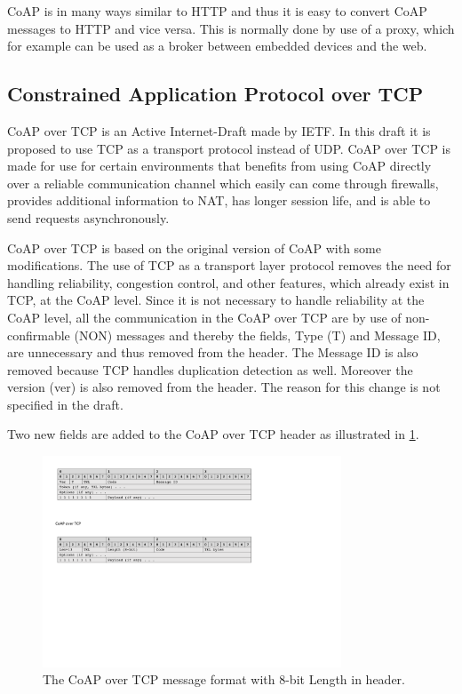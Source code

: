 CoAP is in many ways similar to HTTP and thus it is easy to convert CoAP messages to HTTP and vice versa. This is normally done by use of a proxy, which for example can be used as a broker between embedded devices and the web. 




\subsection{Constrained Application Protocol over TCP}
CoAP over TCP is an Active Internet-Draft made by IETF. 
In this draft it is proposed to use TCP as a transport protocol instead of UDP.
CoAP over TCP is made for use for certain environments that benefits from using CoAP directly over a reliable communication channel which easily can come through firewalls, provides additional information to NAT, has longer session life, and is able to send requests asynchronously. 

CoAP over TCP is based on the original version of CoAP with some modifications. 
The use of TCP as a transport layer protocol removes the need for handling reliability, congestion control, and other features, which already exist in TCP, at the CoAP level.
Since it is not necessary to handle reliability at the CoAP level, all the communication in the CoAP over TCP are by use of non-confirmable (NON) messages and thereby the fields, Type (T) and Message ID, are unnecessary and thus removed from the header. 
The Message ID is also removed because TCP handles duplication detection as well.
Moreover the version (ver) is also removed from the header. The reason for this change is not specified in the draft.

Two new fields are added to the CoAP over TCP header as illustrated in \figurename{\ref{fig:msgformatcoapovertcp}}.
\begin{figure}[bht]
	\centering
	\includegraphics[width=3.5in]{gfx/msgformat-coapovertcp}
	\caption{The CoAP over TCP message format with 8-bit Length in header.}
	\label{fig:msgformatcoapovertcp}
\end{figure}


